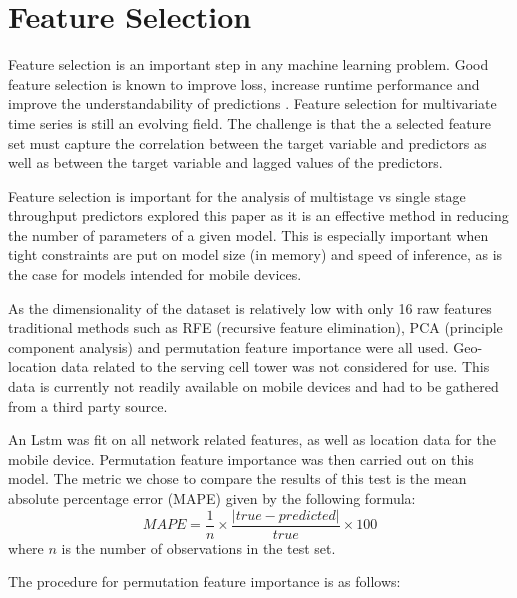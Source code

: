 \section{Feature Selection}
Feature selection is an important step in any machine learning problem. Good feature selection is known to improve loss, increase runtime performance and improve the understandability of predictions \cite{guyon2003introduction}.
Feature selection for multivariate time series is still an evolving field. The challenge is that the a selected feature set must capture the correlation between the target variable and predictors as well as between the target variable and lagged values of the predictors.

Feature selection is important for the analysis of multistage vs single stage throughput predictors explored this paper as it is an effective method in reducing the number of parameters of a given model. This is especially important when tight constraints are put on model size (in memory) and speed of inference, as is the case for models intended for mobile devices.

As the dimensionality of the dataset is relatively low with only 16 raw features traditional methods such as RFE (recursive feature elimination), PCA (principle component analysis) and permutation feature importance were all used. Geo-location data related to the serving cell tower was not considered for use. This data is currently not readily available on mobile devices and had to be gathered from a third party source.

An Lstm was fit on all network related features, as well as location data for the mobile device. Permutation feature importance was then carried out on this model. The metric we chose to compare the results of this test is the mean absolute percentage error (MAPE) given by the following formula: \\

\begin{equation}
MAPE = \frac{1}{n} \times \frac{\left|true-predicted\right|}{true} \times 100
\end{equation}
where $n$ is the number of observations in the test set.

The procedure for permutation feature importance is as follows:

